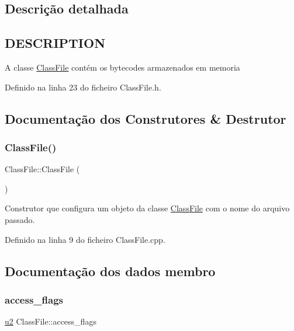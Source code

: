 \subsection{Descrição detalhada}
\hypertarget{classClassFile_DESCRIPTION}{}\subsection{D\+E\+S\+C\+R\+I\+P\+T\+I\+ON}\label{classClassFile_DESCRIPTION}
A classe \hyperlink{classClassFile}{Class\+File} contém os bytecodes armazenados em memoria 

Definido na linha 23 do ficheiro Class\+File.\+h.



\subsection{Documentação dos Construtores \& Destrutor}
\mbox{\label{classClassFile_a47669d90346c9fa0db30ae582c74a199}} 
\subsubsection{\texorpdfstring{Class\+File()}{ClassFile()}}
{\footnotesize\ttfamily Class\+File\+::\+Class\+File (\begin{DoxyParamCaption}{ }\end{DoxyParamCaption})}



Construtor que configura um objeto da classe \hyperlink{classClassFile}{Class\+File} com o nome do arquivo passado. 



Definido na linha 9 do ficheiro Class\+File.\+cpp.



\subsection{Documentação dos dados membro}
\mbox{\label{classClassFile_ae88db578147f7ee0d6fc1aeacb341854}} 
\subsubsection{\texorpdfstring{access\+\_\+flags}{access\_flags}}
{\footnotesize\ttfamily \hyperlink{BasicTypes_8h_a732cde1300aafb73b0ea6c2558a7a54f}{u2} Class\+File\+::access\+\_\+flags}



